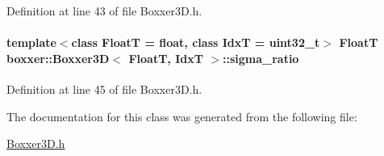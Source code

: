 Definition at line 43 of file Boxxer3\+D.\+h.

\paragraph[{\texorpdfstring{sigma\+\_\+ratio}{sigma_ratio}}]{\setlength{\rightskip}{0pt plus 5cm}template$<$class FloatT  = float, class IdxT  = uint32\+\_\+t$>$ FloatT {\bf boxxer\+::\+Boxxer3D}$<$ FloatT, IdxT $>$\+::sigma\+\_\+ratio}\hypertarget{classboxxer_1_1Boxxer3D_a63a9a0d9c56c11f34c7f2c80e0556335}{}\label{classboxxer_1_1Boxxer3D_a63a9a0d9c56c11f34c7f2c80e0556335}


Definition at line 45 of file Boxxer3\+D.\+h.



The documentation for this class was generated from the following file\+:\begin{DoxyCompactItemize}
\item 
\hyperlink{Boxxer3D_8h}{Boxxer3\+D.\+h}\end{DoxyCompactItemize}
